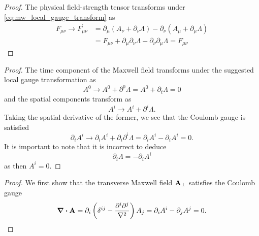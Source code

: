 \mwlogalgaugeinvariance
\begin{proof}
	The physical field-strength tensor transforms under \cref{eq:mw_local_gauge_transform} as
	\begin{equation*}
		\begin{split}
			F_{\mu\nu}
			\to
			F_{\mu\nu}^\prime
			&=
			\partial_\mu\left(A_\nu+\partial_\nu\Lambda\right)
			-
			\partial_\nu\left(A_\mu+\partial_\mu\Lambda\right)
			\\
			&=
			F_{\mu\nu}
			+
			\partial_\mu\partial_\nu\Lambda
			-
			\partial_\nu\partial_\mu\Lambda
			=
			F_{\mu\nu}
		\end{split}
	\end{equation*}	
\end{proof}

\mwcoulombfixing
\begin{proof}
	The time component of the Maxwell field transforms under the suggested local gauge transformation as
	\begin{equation*}
		A^0
		\to
		A^0
		+
		\partial^0\Lambda
		=
		A^0
		+
		\partial_t\Lambda
		=
		0
	\end{equation*}
	and the spatial components transform as
	\begin{equation*}
		A^i
		\to
		A^i
		+
		\partial^i\Lambda
		.
	\end{equation*}
	Taking the spatial derivative of the former, we see that the Coulomb gauge is satisfied
	\begin{equation*}
		\partial_i A^i
		\to
		\partial_i A^i
		+
		\partial_i \partial^i\Lambda
		=
		\partial_i A^i
		-
		\partial_i A^i
		=
		0
		.
	\end{equation*}
	It is important to note that it is incorrect to deduce
	\begin{equation*}
		\partial_i
		\Lambda
		=
		-
		\partial_i A^i
	\end{equation*}
	as then $A^i=0$.
\end{proof}
\mwcoulombtransverse
\begin{proof}
	We first show that the transverse Maxwell field $\vb{A}_\perp$ satisfies the Coulomb gauge
	\begin{equation*}
		\div\vb{A}
		=
		\partial_i
		\left(
			\delta^{ij}
			-
			\frac{\partial^i\partial^j}{\laplacian}
		\right)
		A_j
		=
		\partial_iA^i
		-
		\partial_jA^j
		=
		0
		.
	\end{equation*}
\end{proof}
\mwcoulombeom
